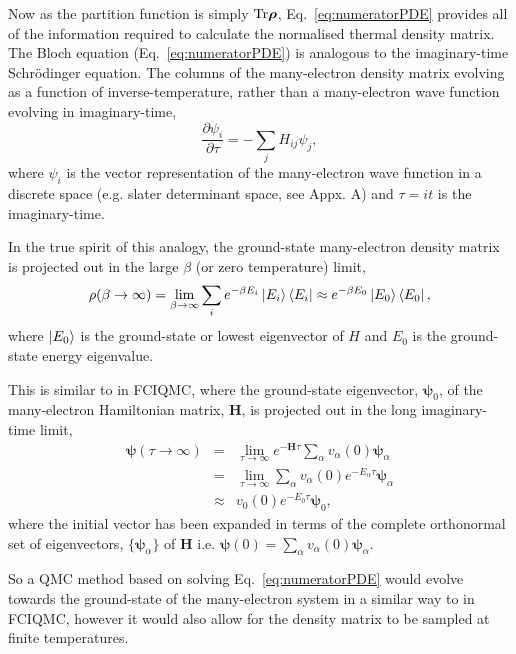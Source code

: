 Now as the partition function is simply $\textnormal{Tr}\bm{\rho}$, Eq.~\ref{eq:numeratorPDE} provides all of the information required to calculate the normalised thermal density matrix. The Bloch equation (Eq.~\ref{eq:numeratorPDE}) is analogous to the imaginary-time Schr\"{o}dinger equation. The columns of the many-electron density matrix evolving as a function of inverse-temperature, rather than a many-electron wave function evolving in imaginary-time,
\begin{equation}
\label{eq:imaginaryTimeSchrodinger}
\frac{\partial\psi_i}{\partial\tau} = -\sum_j H_{ij}\psi_j,
\end{equation}
where $\psi_i$ is the vector representation of the many-electron wave function in a discrete space (e.g. slater determinant space, see Appx. A) and $\tau = it$ is the imaginary-time.

In the true spirit of this analogy, the ground-state many-electron density matrix is projected out in the large $\beta$ (or zero temperature) limit,
\begin{equation}
\label{eq:zeroTemperature}
\rho(\beta\to\infty)=\lim_{\beta \to \infty}\sum_{i}e^{-\beta E_i}\ket{E_i}\bra{E_i} \approx e^{-\beta E_0}\ket{E_0}\bra{E_0},
\end{equation}
where $\ket{E_0}$ is the ground-state or lowest eigenvector of $H$ and $E_0$ is the ground-state energy eigenvalue.

This is similar to in FCIQMC, where the ground-state eigenvector, $\bm{\psi}_0$, of the many-electron Hamiltonian matrix, $\bm{H}$, is projected out in the long imaginary-time limit\cite{Spencer2012},
\begin{eqnarray}
\bm{\psi}(\tau \to \infty) &=& \lim_{\tau \to \infty} e^{-\bm{H} \tau}\sum_{\alpha} v_\alpha(0) \bm{\psi}_{\alpha}\nonumber \\
&=& \lim_{\tau \to \infty} \sum_{\alpha} v_\alpha(0) e^{-E_{\alpha} \tau}\bm{\psi}_{\alpha} \nonumber\\
&\approx& v_0(0)e^{-E_0 \tau}\bm{\psi}_0,
\end{eqnarray}
where the initial vector has been expanded in terms of the complete orthonormal set of eigenvectors, $\{\bm{\psi}_{\alpha}\}$ of $\bm{H}$ i.e. $\bm{\psi}(0) = \sum_{\alpha} v_{\alpha}(0) \bm{\psi}_{\alpha}$.

So a QMC method based on solving Eq.~\ref{eq:numeratorPDE} would evolve towards the ground-state of the many-electron system in a similar way to in FCIQMC, however it would also allow for the density matrix to be sampled at finite temperatures.

